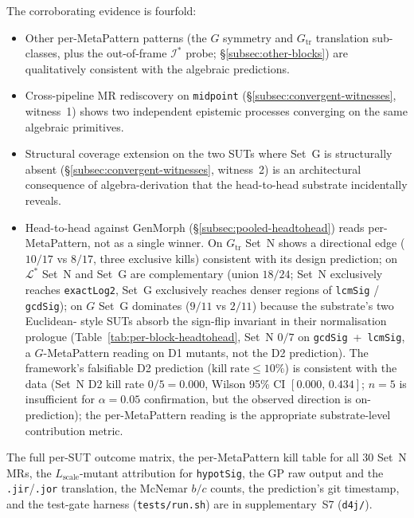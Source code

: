 \documentclass[acmsmall,screen,review]{acmart}
\begin{document}
The corroborating evidence is fourfold:
\begin{itemize}[nosep,leftmargin=*]
  \item Other per-MetaPattern patterns (the $G$ symmetry and $G_{\mathrm{tr}}$ translation sub-classes, plus the out-of-frame $\mathcal{I}^{*}$ probe;
        \S\ref{subsec:other-blocks}) are qualitatively consistent
        with the algebraic predictions.
  \item Cross-pipeline MR rediscovery on \texttt{midpoint}
        (\S\ref{subsec:convergent-witnesses}, witness~1) shows two
        independent epistemic processes converging on the same
        algebraic primitives.
  \item Structural coverage extension on the two SUTs where Set~G
        is structurally absent (\S\ref{subsec:convergent-witnesses},
        witness~2) is an architectural consequence of
        algebra-derivation that the head-to-head substrate
        incidentally reveals.
  \item Head-to-head against GenMorph
        (\S\ref{subsec:pooled-headtohead}) reads per-MetaPattern, not as a
        single winner. On $G_{\mathrm{tr}}$ Set~N shows a directional
        edge ($10/17$ vs $8/17$, three exclusive kills) consistent with
        its design prediction; on $\mathcal{L}^{*}$ Set~N and Set~G
        are complementary (union $18/24$; Set~N exclusively reaches
        \texttt{exactLog2}, Set~G exclusively reaches denser regions
        of \texttt{lcmSig} / \texttt{gcdSig}); on $G$ Set~G dominates
        ($9/11$ vs $2/11$) because the substrate's two Euclidean-
        style SUTs absorb the sign-flip invariant in their
        normalisation prologue (Table~\ref{tab:per-block-headtohead},
        Set~N $0/7$ on \texttt{gcdSig}~+~\texttt{lcmSig}, a $G$-MetaPattern
        reading on D1 mutants, not the D2 prediction). The
        framework's falsifiable D2 prediction
        ($\mathrm{kill\;rate} \le 10\%$) is consistent with the data
        (Set~N D2 kill rate $0/5 = 0.000$, Wilson 95\% CI
        $[0.000,\,0.434]$; $n = 5$ is insufficient for $\alpha = 0.05$
        confirmation, but the observed direction is on-prediction);
        the per-MetaPattern reading is the appropriate substrate-level
        contribution metric.
\end{itemize}

The full per-SUT outcome matrix, the per-MetaPattern kill table for all 30
Set~N MRs, the $L_{\mathrm{scale}}$-mutant attribution for
\texttt{hypotSig}, the GP raw output and the
\texttt{.jir}/\texttt{.jor} translation, the McNemar $b/c$ counts,
the prediction's git timestamp, and the test-gate harness
(\texttt{tests/run.sh}) are in supplementary~S7 (\texttt{d4j/}).
\end{document}
